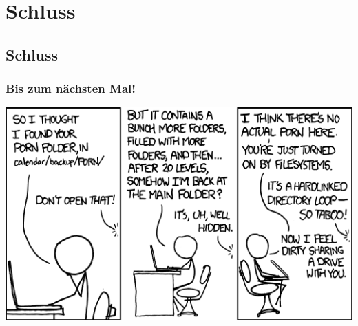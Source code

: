 \section{Schluss}
\subsection{Schluss}
\begin{frame}
\frametitle{Bis zum nächsten Mal!}
\begin{center}
  \includegraphics[width=1 \textheight]{images/xkcd_981.png}
\end{center}
\end{frame}


